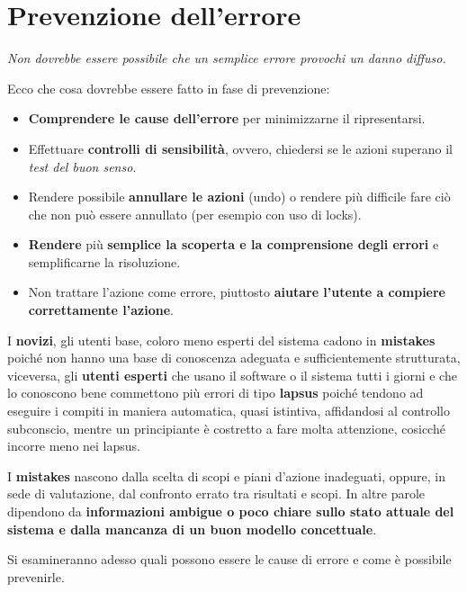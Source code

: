 \section{Prevenzione dell'errore}

\begin{flushleft}
	\textit{Non dovrebbe essere possibile che un semplice errore provochi un danno diffuso.}
\end{flushleft}

Ecco che cosa dovrebbe essere fatto in fase di prevenzione:

\begin{itemize}
	\itemsep-0.3em
	\item \textbf{Comprendere le cause dell'errore} per minimizzarne il ripresentarsi.
	\item Effettuare \textbf{controlli di sensibilità}, ovvero, chiedersi se le azioni superano il \textit{test del buon senso}.
	\item Rendere possibile \textbf{annullare le azioni} (undo) o rendere più difficile fare ciò che non può essere annullato (per esempio con uso di locks).
	\item \textbf{Rendere} più \textbf{semplice la scoperta e la comprensione degli errori} e semplificarne la risoluzione.
	\item Non trattare l'azione come errore, piuttosto \textbf{aiutare l'utente a compiere correttamente l'azione}.
\end{itemize}

I \textbf{novizi}, gli utenti base, coloro meno esperti del sistema cadono in \textbf{mistakes} poiché non hanno una base di
conoscenza adeguata e sufficientemente strutturata, viceversa, gli \textbf{utenti esperti} che usano il software o il sistema tutti i giorni e
che lo conoscono bene commettono più errori di tipo \textbf{lapsus} poiché tendono ad eseguire i compiti in maniera automatica, quasi istintiva,
affidandosi al controllo subconscio, mentre un
principiante è costretto a fare molta attenzione, cosicché incorre meno nei lapsus.

I \textbf{mistakes} nascono dalla scelta di scopi e piani d'azione inadeguati, oppure, in sede di valutazione, dal confronto errato tra
risultati e scopi. In altre parole dipendono da \textbf{informazioni ambigue o poco chiare sullo stato attuale del sistema e dalla mancanza di un
buon modello concettuale}.

Si esamineranno adesso quali possono essere le cause di errore e come è possibile prevenirle.

